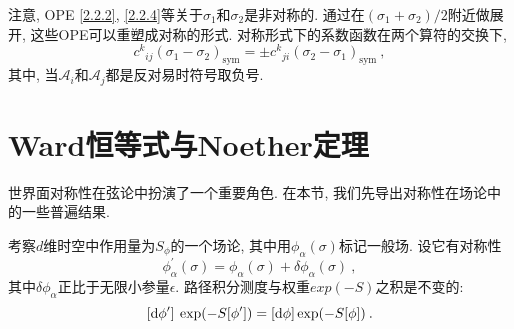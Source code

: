 注意, OPE \eqref{2.2.2}, \eqref{2.2.4}等关于$\sigma_{1}$和$\sigma_{2}$是非对称的. 通过在$(\sigma_{1}+\sigma_{2})/ 2$附近做展开, 这些OPE可以重塑成对称的形式. 
对称形式下的系数函数在两个算符的交换下,
\begin{equation}
c^{k}{}_{ij}(\sigma_{1}-\sigma_{2})_{\mathrm{sym}}= \pm c^{k}{}_{j i}(\sigma_{2}-\sigma_{1})_{\mathrm{sym}} \:,
\end{equation}
其中, 当$\mathscr{A}_{i}$和$\mathscr{A}_{j}$都是反对易时符号取负号.


\section{\texorpdfstring{Ward恒等式与Noether定理}{2.3 Ward identities and Noether theorem}}

世界面对称性在弦论中扮演了一个重要角色. 在本节, 我们先导出对称性在场论中的一些普遍结果.

考察$d$维时空中作用量为$S_\phi$的一个场论, 其中用$\phi_\alpha(\sigma)$标记一般场. 设它有对称性
\begin{equation} \label{2.3.1}
\phi_{\alpha}^{\prime}(\sigma)=\phi_{\alpha}(\sigma)+\delta \phi_{\alpha}(\sigma) \:,
\end{equation}
其中$\delta \phi_\alpha$正比于无限小参量$\epsilon$. 路径积分测度与权重$exp(-S)$之积是不变的:
\begin{equation} \label{2.3.2}
	[\mathrm{d} \phi^{\prime}]\: \exp(-S[\phi^{\prime}])=[\mathrm{d}  \phi] \exp (-S[\phi]) \:.
\end{equation}

